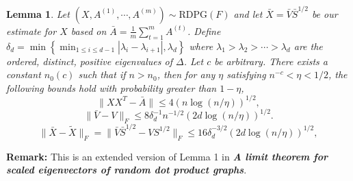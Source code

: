 \documentclass[a4paper]{article}
\newtheorem{lemma}[fact]{Lemma}
\begin{document}
\begin{lemma}
\label{lm:AllDiff}
Let $(X, A^{(1)}, \cdots, A^{(m)}) \sim \mathrm{RDPG}(F)$ and let $\bar{X} = \bar{V} \bar{S}^{1/2}$ be our estimate for $X$ based on $\bar{A} = \frac{1}{m} \sum_{t = 1}^m A^{(t)}$.
Define $\delta_d = \min \left\{ \min_{1 \le i \le d-1} |\lambda_i - \lambda_{i+1}|, \lambda_d \right\}$ where $\lambda_1 > \lambda_2 > \cdots > \lambda_d$ are the ordered, distinct, positive eigenvalues of $\Delta$. Let $c$ be arbitrary. There exists a constant $n_0(c)$ such that if $n > n_0$, then for any $\eta$ satisfying $n^{-c} < \eta < 1/2$, the following bounds hold with probability greater than $1-\eta$,
\begin{equation}
\label{eqn:AbarDiff}
\|X X^T - \bar{A}\| \le 4(n \log(n/\eta))^{1/2},
\end{equation}
\begin{equation}
\label{eqn:VDiff}
\|\bar{V} - V\|_F \le 8 \delta_d^{-1} n^{-1/2} (2d \log(n/\eta))^{1/2}.
\end{equation}
\begin{equation}
\label{eqn:XDiff}
\|\bar{X} - \tilde{X}\|_F = \|\bar{V} \bar{S}^{1/2} - V S^{1/2}\|_F \le 16 \delta_d^{-3/2} (2d \log(n/\eta))^{1/2},
\end{equation}
\end{lemma}
\textbf{Remark:} This is an extended version of Lemma 1 in \textbf{\textit{A limit theorem for scaled eigenvectors of random dot product graphs}}. \\
\noindent
\end{document}
